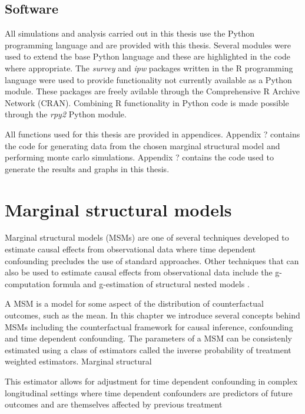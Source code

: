 \documentclass[11pt]{article}
\begin{document}
    \subsection{Software}\label{software}

All simulations and analysis carried out in this thesis use the Python
programming language and are provided with this thesis. Several modules
were used to extend the base Python language and these are highlighted
in the code where appropriate. The \emph{survey} and \emph{ipw} packages
written in the R programming language were used to provide functionality
not currently available as a Python module. These packages are freely
avilable through the Comprehensive R Archive Network (CRAN). Combining R
functionality in Python code is made possible through the \emph{rpy2}
Python module. \linebreak

All functions used for this thesis are provided in appendices. Appendix
? contains the code for generating data from the chosen marginal
structural model and performing monte carlo simulations. Appendix ?
contains the code used to generate the results and graphs in this
thesis.

    \newpage

    \section{Marginal structural models}\label{marginal-structural-models}

Marginal structural models (MSMs) are one of several techniques
developed to estimate causal effects from observational data where time
dependent confounding precludes the use of standard approaches. Other
techniques that can also be used to estimate causal effects from
observational data include the g-computation formula and g-estimation of
structural nested models \citet{Daniel2013}.

A MSM is a model for some aspect of the distribution of counterfactual
outcomes, such as the mean. In this chapter we introduce several
concepts behind MSMs including the counterfactual framework for causal
inference, confounding and time dependent confounding. The parameters of
a MSM can be consistenly estimated using a class of estimators called
the inverse probability of treatment weighted estimators. Marginal
structural

This estimator allows for adjustment for time dependent confounding in
complex longitudinal settings where time dependent confounders are
predictors of future outcomes and are themselves affected by previous
treatment \citet{}
\end{document}
